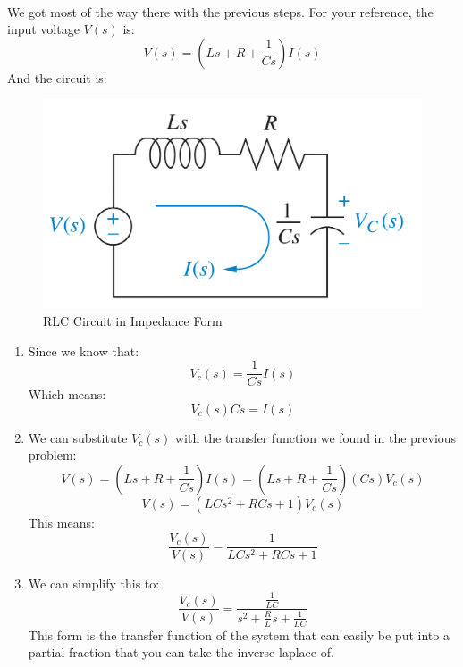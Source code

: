 \documentclass{article}
\theoremstyle{mytheoremstyle}
\theoremstyle{mytheoremstyle}
\theoremstyle{myproblemstyle}
\theoremstyle{break}
\begin{document}
\begin{solution}[\textcolor{blue}{Transfer Function of an RLC Circuit - Cont.}]~
	\\We got most of the way there with the previous steps. For your reference, the input voltage $V(s)$ is:
	\begin{equation}
		V(s) = (Ls + R + \frac{1}{Cs})I(s)
	\end{equation}
	And the circuit is:
	\begin{figure}[H]
		\includegraphics[scale=0.2]{Simple RLC Circuit in Impedence Form}
		\centering
		\caption{RLC Circuit in Impedance Form}
	\end{figure}
\begin{enumerate}
	\item Since we know that:
	\begin{equation}
		V_c(s) = \frac{1}{Cs}I(s)
	\end{equation}
	Which means:
	\begin{equation}
		V_c(s) Cs =I(s)
	\end{equation}
	\item We can substitute $V_c(s)$ with the transfer function we found in the previous problem:
	\begin{equation}
		V(s) = (Ls + R + \frac{1}{Cs})I(s) = (Ls + R + \frac{1}{Cs})(Cs)V_c(s) 
	\end{equation}
	\begin{equation}
		V(s) = (L C s^{2} + R C s + 1) V_{c}{(s)}
	\end{equation}
	This means:
	\begin{equation}
		\frac{V_c(s)}{V(s)} = \frac{1}{L C s^{2} + R C s + 1}
	\end{equation}
	\item We can simplify this to:
	\begin{equation}
		\frac{V_c(s)}{V(s)} =\frac{\frac{1}{LC}}{s^2 + \frac{R}{L}s + \frac{1}{LC}}
	\end{equation}
	This form is the transfer function of the system that can easily be put into a partial fraction that you can take the inverse laplace of.
	\end{enumerate}
\end{solution}
\end{document}
